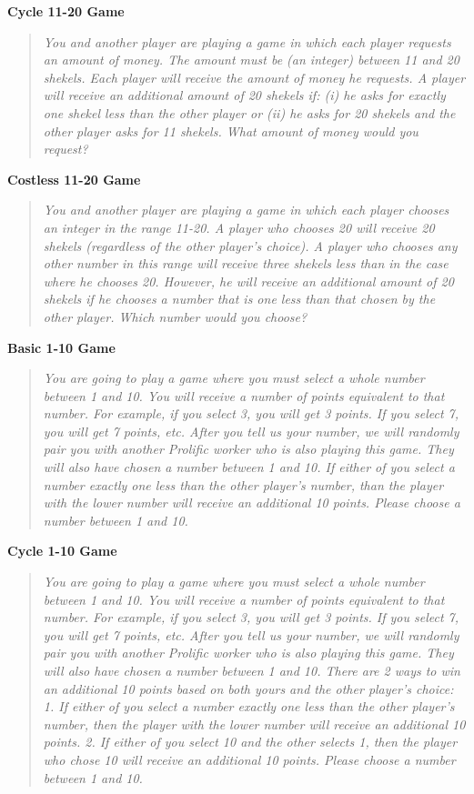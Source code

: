 \documentclass[11pt]{article}
\theoremstyle{definition}
\begin{document}
\noindent\textbf{Cycle 11-20 Game}
\begin{quote}
\emph{You and another player are playing a game in which each player requests an amount of money.
The amount must be (an integer) between 11 and 20 shekels. 
Each player will receive the amount of money he requests.
A player will receive an additional amount of 20 shekels if: (i)  he asks for exactly one shekel less than the other player or  (ii) he asks for 20 shekels and the other player asks for 11 shekels.
What amount of money would you request?}
\end{quote}

\noindent\textbf{Costless 11-20 Game}
\begin{quote}
\emph{You and another player are playing a game in which each player chooses an integer in the range 11-20.
A player who chooses 20 will receive 20 shekels (regardless of the other player's choice). 
A player who chooses any other number in this range will receive three shekels less than in the case where he chooses 20. 
However, he will receive an additional amount of 20 shekels if he chooses a number that is one less than that chosen by the other player. 
Which number would you choose?}
\end{quote}

\noindent\textbf{Basic 1-10 Game}
\begin{quote}
\emph{You are going to play a game where you must select a whole number between 1 and 10.
You will receive a number of points equivalent to that number. For example, if you select 3, you will get 3 points. 
If you select 7, you will get 7 points, etc.
After you tell us your number, we will randomly pair you with another Prolific worker who is also playing this game. 
They will also have chosen a number between 1 and 10.
If either of you select a number exactly one less than the other player's number, than the player with the lower number will receive an additional 10 points.
Please choose a number between 1 and 10. }
\end{quote}

\noindent\textbf{Cycle 1-10 Game}
\begin{quote}
\emph{You are going to play a game where you must select a whole number between 1 and 10.
You will receive a number of points equivalent to that number. 
For example, if you select 3, you will get 3 points. 
If you select 7, you will get 7 points, etc.
After you tell us your number, we will randomly pair you with another Prolific worker who is also playing this game. 
They will also have chosen a number between 1 and 10.
There are 2 ways to win an additional 10 points based on both yours and the other player's choice:
1. If either of you select a number exactly one less than the other player's number, then the player with the lower number will receive an additional 10 points.
2. If either of you select 10 and the other selects 1, then the player who chose 10 will receive an additional 10 points.
Please choose a number between 1 and 10.}
\end{quote}
\end{document}
